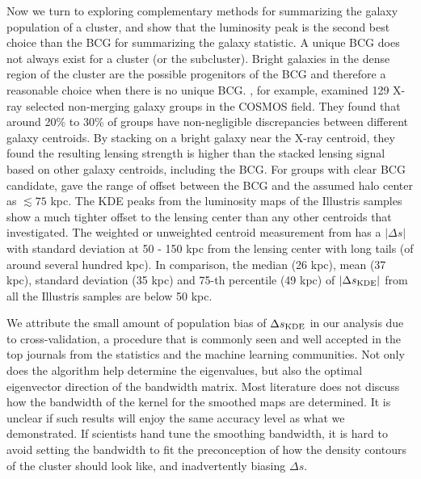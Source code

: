 Now we turn to exploring complementary methods for summarizing
the galaxy population of a cluster, and show that  the luminosity peak 
is the second best choice than the BCG for summarizing the galaxy statistic.
A unique BCG does not always exist for a cluster (or the subcluster).   
Bright galaxies in the dense region of the cluster are the possible progenitors 
of the BCG and therefore a reasonable choice when there is no unique BCG. 
\cite{George2012a}, for example, examined 129 X-ray selected non-merging galaxy 
groups in the COSMOS field.
They found that around 20\% to 30\% of groups have non-negligible discrepancies
between different galaxy centroids. 
By stacking on a bright galaxy near the X-ray centroid, they found  
the resulting lensing strength is higher than the stacked lensing signal based
on other galaxy centroids, including the BCG. 
For groups with clear BCG candidate, \cite{George2012a} gave the range of
offset between the BCG and the assumed halo center as $\lesssim 75$ kpc. 
The KDE peaks from the luminosity maps of the Illustris samples show a much 
tighter offset to the 
lensing center than any other centroids that \cite{George2012a} investigated. 
The weighted or unweighted centroid measurement from \cite{George2012a} has a 
$|\Delta s|$ with standard deviation at 50 - 150 kpc from the
lensing center with long tails (of around several hundred kpc). 
In comparison, the median (26 kpc), mean (37 kpc), standard deviation (35 kpc) 
and 75-th percentile (49 kpc) of 
$|\Delta s_{\rm KDE}|$ from all the Illustris samples are below 50 kpc. 

We attribute the small amount of population bias of $\Delta s_{\rm KDE}$ in our
analysis due 
to cross-validation, a procedure that is commonly seen and well accepted 
in the top journals 
from the statistics and the machine learning communities. 
Not only does the algorithm help
determine the eigenvalues, but also the optimal eigenvector direction of 
the bandwidth matrix. 
Most literature does not discuss how the bandwidth of 
the kernel for the smoothed maps are determined.  
It is unclear if such results will enjoy the same accuracy level as what
we demonstrated. 
If scientists hand tune the smoothing bandwidth, it is hard to
avoid setting the bandwidth to fit the preconception of how the density
contours of the cluster 
should look like, and inadvertently biasing $\Delta s$.

